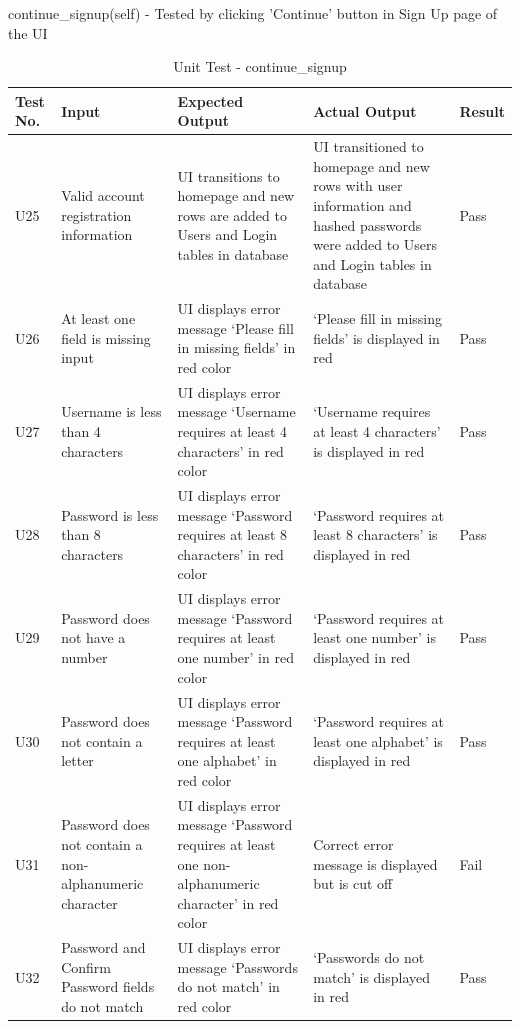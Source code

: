 \documentclass[12pt, titlepage]{article}
\begin{document}
\newpage
continue\_signup(self) - Tested by clicking 'Continue' button in Sign Up page of the UI 
\begin{table}[H]
  \begin{tabular}{| p{} | p{}| p{}| p{}| p{}|}
    \hline
    \rowcolor[gray]{0.9}
    Test No. & Input & Expected Output & Actual Output & Result\\
    \hline
    U25 & Valid account registration information & UI transitions to homepage and new rows are added to Users and Login tables in database & UI transitioned to homepage and new rows with user information and hashed passwords were added to Users and Login tables in database & Pass \\
    \hline
    U26 & At least one field is missing input & UI displays error message ‘Please fill in missing fields’ in red color & ‘Please fill in missing fields’ is displayed in red & Pass \\
    \hline
    U27 & Username is less than 4 characters & UI displays error message ‘Username requires at least 4 characters’ in red color & ‘Username requires at least 4 characters’ is displayed in red & Pass \\
    \hline
    U28 & Password is less than 8 characters & UI displays error message ‘Password requires at least 8 characters’ in red color & ‘Password requires at least 8 characters’ is displayed in red & Pass \\
    \hline
    U29 & Password does not have a number & UI displays error message ‘Password requires at least one number’ in red color & ‘Password requires at least one number’ is displayed in red & Pass \\
    \hline
    U30 & Password does not contain a letter & UI displays error message ‘Password requires at least one alphabet’ in red color & ‘Password requires at least one alphabet’ is displayed in red & Pass \\
    \hline
    U31 & Password does not contain a non-alphanumeric character & UI displays error message ‘Password requires at least one non-alphanumeric character’ in red color & Correct error message is displayed but is cut off & Fail \\
    \hline
    U32 & Password and Confirm Password fields do not match & UI displays error message ‘Passwords do not match’ in red color & ‘Passwords do not match’ is displayed in red & Pass \\
    \hline
  \end{tabular}
  \caption{Unit Test - continue\_signup}
\end{table}
\end{document}
